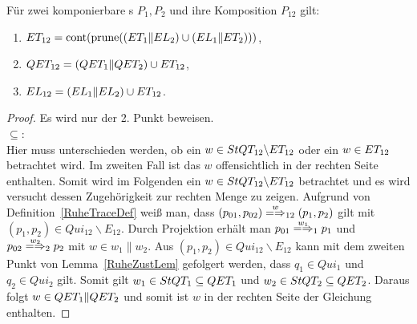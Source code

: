 \begin{Satz}
  \label{RuheSemSatz}
  Für zwei komponierbare \MEIO{}s $P_1,P_2$ und ihre Komposition $P_{12}$ gilt:
  \begin{enumerate}
    \item $ET _{12}=\mathrm{cont} (\mathrm{prune} ((ET _1\|EL _2)\cup (EL _1\|ET _2)))$,
    \item $QET _{12}=(QET _1\|QET _2)\cup ET _{12}$,
    \item $EL _{12}=(EL _1\|EL _2)\cup ET _{12}$.
  \end{enumerate}
\end{Satz}
\begin{proof}
  Es wird nur der 2. Punkt beweisen.\\
  \glqq$\subseteq$\grqq{}:\\
  Hier muss unterschieden werden, ob ein $w\in StQT _{12}\backslash ET _{12}$
  oder ein $w\in ET _{12}$ betrachtet wird. Im zweiten Fall ist das $w$
  offensichtlich in der rechten Seite enthalten. Somit wird im Folgenden ein
  $w\in StQT _{12}\backslash ET _{12}$ betrachtet und es wird versucht dessen
  Zugehörigkeit zur rechten Menge zu zeigen. Aufgrund von
  Definition~\ref{RuheTraceDef} weiß man, dass $(p_{01},p_{02})
  \weakmay[w]_{12} (p_1,p_2)$ gilt mit $(p_1,p_2)\in Qui_{12} \backslash
  E_{12}$. Durch Projektion erhält man $p_{01} \weakmay[w_1]_1 p_1$ und $p_{02}
  \weakmay[w_2]_2p_2$ mit $w\in w_1\|w_2$. Aus $(p_1,p_2)\in Qui_{12}
  \backslash E_{12}$ kann mit dem zweiten Punkt von Lemma~\ref{RuheZustLem}
  gefolgert werden, dass $q_1\in Qui_1$ und $q_2\in Qui_2$ gilt. Somit gilt
  $w_1 \in StQT _1\subseteq QET _1$ und $w_2\in StQT _2\subseteq QET _2$.
  Daraus folgt $w\in QET _1\|QET _2$ und somit ist $w$ in der rechten Seite
  der Gleichung enthalten.


\end{proof}
